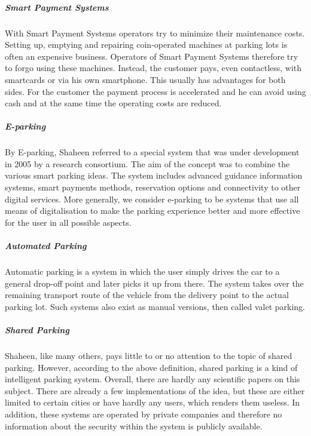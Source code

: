 \documentclass[
a4paper,     %
titlepage,   %
14pt         %
]{scrartcl}  %
\theoremstyle{mystyle}
\begin{document}
\subparagraph{Smart Payment Systems}
With Smart Payment Systems operators try to minimize their maintenance costs. Setting up, emptying and repairing coin-operated machines at parking lots is often an expensive business. Operators of Smart Payment Systems therefore try to forgo using these machines. Instead, the customer pays, even contactless, with smartcards or via his own smartphone. This usually has advantages for both sides. For the customer the payment process is accelerated and he can avoid using cash and at the same time the operating costs are reduced.

\subparagraph{E-parking}
By E-parking, Shaheen referred to a special system that was under development in 2005 by a research consortium. The aim of the concept was to combine the various smart parking ideas. The system includes advanced guidance information systems, smart payments methods, reservation options and connectivity to other digital services. More generally, we consider e-parking to be systems that use all means of digitalisation to make the parking experience better and more effective for the user in all possible aspects.

\subparagraph{Automated Parking}
Automatic parking is a system in which the user simply drives the car to a general drop-off point and later picks it up from there. The system takes over the remaining transport route of the vehicle from the delivery point to the actual parking lot. Such systems also exist as manual versions, then called valet parking.\\

\subparagraph{Shared Parking}
Shaheen, like many others, pays little to or no attention to the topic of shared parking. However, according to the above definition, shared parking is a kind of intelligent parking system. Overall, there are hardly any scientific papers on this subject. There are already a few implementations of the idea, but these are either limited to certain cities or have hardly any users, which renders them useless. In addition, these systems are operated by private companies and therefore no information about the security within the system is publicly available.
\end{document}

